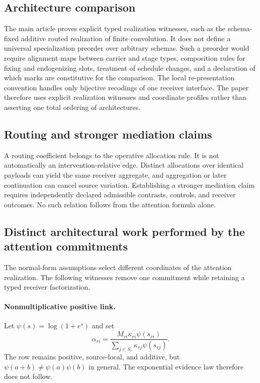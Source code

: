 \subsection{Architecture comparison}

The main article proves explicit typed realization witnesses, such as the schema-fixed additive routed realization of finite convolution. It does not define a universal specialization preorder over arbitrary schemas. Such a preorder would require alignment maps between carrier and stage types, composition rules for fixing and endogenizing slots, treatment of schedule changes, and a declaration of which marks are constitutive for the comparison. The local re-presentation convention handles only bijective recodings of one receiver interface. The paper therefore uses explicit realization witnesses and coordinate profiles rather than asserting one total ordering of architectures.

\subsection{Routing and stronger mediation claims}

A routing coefficient belongs to the operative allocation rule. It is not automatically an intervention-relative edge. Distinct allocations over identical payloads can yield the same receiver aggregate, and aggregation or later continuation can cancel source variation. Establishing a stronger mediation claim requires independently declared admissible contrasts, controls, and receiver outcomes. No such relation follows from the attention formula alone.

\subsection{Distinct architectural work performed by the attention commitments}\label{supp:commitment-witnesses}

The normal-form assumptions select different coordinates of the attention realization. The following witnesses remove one commitment while retaining a typed receiver factorization.

\paragraph{Nonmultiplicative positive link.}
Let $\psi(s)=\log(1+e^s)$ and set
\[
\alpha_{ri}
=
\frac{M_{ri}\kappa_{ri}\psi(s_{ri})}
{\sum_{j\in S_r}\kappa_{rj}\psi(s_{rj})}.
\]
The row remains positive, source-local, and additive, but $\psi(a+b)\neq\psi(a)\psi(b)$ in general. The exponential evidence law therefore does not follow.


